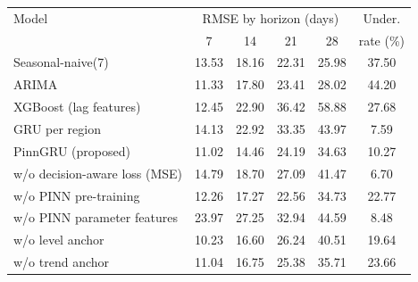 \begin{tabular}{l c c c c c}
\toprule
Model & \multicolumn{4}{c}{RMSE by horizon (days)} & Under.
\\
 & 7 & 14 & 21 & 28 & rate (\%)\\
\midrule
Seasonal-naive(7) & 13.53 & 18.16 & 22.31 & 25.98 & 37.50 \\
ARIMA & 11.33 & 17.80 & 23.41 & 28.02 & 44.20 \\
XGBoost (lag features) & 12.45 & 22.90 & 36.42 & 58.88 & 27.68 \\
GRU per region & 14.13 & 22.92 & 33.35 & 43.97 & 7.59 \\
PinnGRU (proposed) & 11.02 & 14.46 & 24.19 & 34.63 & 10.27 \\
\midrule
  w/o decision-aware loss (MSE) & 14.79 & 18.70 & 27.09 & 41.47 & 6.70 \\
  w/o PINN pre-training & 12.26 & 17.27 & 22.56 & 34.73 & 22.77 \\
  w/o PINN parameter features & 23.97 & 27.25 & 32.94 & 44.59 & 8.48 \\
  w/o level anchor & 10.23 & 16.60 & 26.24 & 40.51 & 19.64 \\
  w/o trend anchor & 11.04 & 16.75 & 25.38 & 35.71 & 23.66 \\
\bottomrule
\end{tabular}
